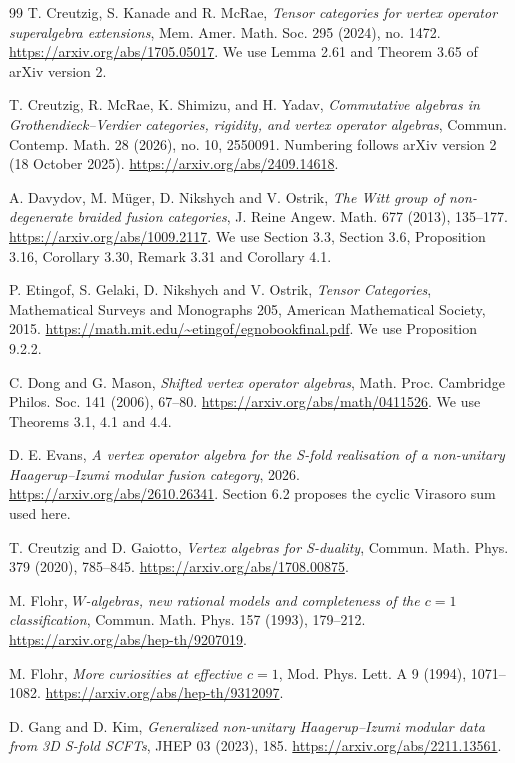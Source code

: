 \documentclass[11pt,a4paper]{article}
\numberwithin{equation}{section}
\theoremstyle{definition}\newtheorem{definition}[theorem]{Definition}
\theoremstyle{remark}\newtheorem{remark}[theorem]{Remark}
\begin{document}
\begin{thebibliography}{99}
T. Creutzig, S. Kanade and R. McRae,
\emph{Tensor categories for vertex operator superalgebra extensions},
Mem. Amer. Math. Soc. 295 (2024), no. 1472.
\url{https://arxiv.org/abs/1705.05017}.
We use Lemma 2.61 and Theorem 3.65 of arXiv version 2.


T. Creutzig, R. McRae, K. Shimizu, and H. Yadav,
\emph{Commutative algebras in Grothendieck--Verdier categories,
rigidity, and vertex operator algebras},
Commun. Contemp. Math. 28 (2026), no. 10, 2550091.
Numbering follows arXiv version 2 (18 October 2025).
\url{https://arxiv.org/abs/2409.14618}.


A. Davydov, M. M\"uger, D. Nikshych and V. Ostrik,
\emph{The Witt group of non-degenerate braided fusion categories},
J. Reine Angew. Math. 677 (2013), 135--177.
\url{https://arxiv.org/abs/1009.2117}.
We use Section 3.3, Section 3.6, Proposition 3.16, Corollary 3.30,
Remark 3.31 and Corollary 4.1.


P. Etingof, S. Gelaki, D. Nikshych and V. Ostrik,
\emph{Tensor Categories}, Mathematical Surveys and Monographs 205,
American Mathematical Society, 2015.
\url{https://math.mit.edu/~etingof/egnobookfinal.pdf}.
We use Proposition 9.2.2.


C. Dong and G. Mason,
\emph{Shifted vertex operator algebras},
Math. Proc. Cambridge Philos. Soc. 141 (2006), 67--80.
\url{https://arxiv.org/abs/math/0411526}.
We use Theorems 3.1, 4.1 and 4.4.



D. E. Evans, \emph{A vertex operator algebra for the S-fold realisation
of a non-unitary Haagerup--Izumi modular fusion category}, 2026.
\url{https://arxiv.org/abs/2610.26341}.
Section 6.2 proposes the cyclic Virasoro sum used here.

T. Creutzig and D. Gaiotto, \emph{Vertex algebras for S-duality},
Commun. Math. Phys. 379 (2020), 785--845.
\url{https://arxiv.org/abs/1708.00875}.

M. Flohr, \emph{$W$-algebras, new rational models and completeness
of the $c=1$ classification}, Commun. Math. Phys. 157 (1993), 179--212.
\url{https://arxiv.org/abs/hep-th/9207019}.

M. Flohr, \emph{More curiosities at effective $c=1$},
Mod. Phys. Lett. A 9 (1994), 1071--1082.
\url{https://arxiv.org/abs/hep-th/9312097}.

D. Gang and D. Kim, \emph{Generalized non-unitary Haagerup--Izumi
modular data from 3D S-fold SCFTs}, JHEP 03 (2023), 185.
\url{https://arxiv.org/abs/2211.13561}.


\end{thebibliography}
\end{document}
